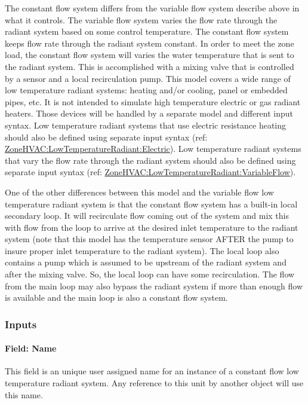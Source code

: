 The constant flow system differs from the variable flow system describe above in what it controls. The variable flow system varies the flow rate through the radiant system based on some control temperature. The constant flow system keeps flow rate through the radiant system constant.  In order to meet the zone load, the constant flow system will varies the water temperature that is sent to the radiant system. This is accomplished with a mixing valve that is controlled by a sensor and a local recirculation pump. This model covers a wide range of low temperature radiant systems: heating and/or cooling, panel or embedded pipes, etc. It is not intended to simulate high temperature electric or gas radiant heaters. Those devices will be handled by a separate model and different input syntax. Low temperature radiant systems that use electric resistance heating should also be defined using separate input syntax (ref: \hyperref[zonehvaclowtemperatureradiantelectric]{ZoneHVAC:LowTemperatureRadiant:Electric}). Low temperature radiant systems that vary the flow rate through the radiant system should also be defined using separate input syntax (ref: \hyperref[zonehvaclowtemperatureradiantvariableflow]{ZoneHVAC:LowTemperatureRadiant:VariableFlow}).

One of the other differences between this model and the variable flow low temperature radiant system is that the constant flow system has a built-in local secondary loop. It will recirculate flow coming out of the system and mix this with flow from the loop to arrive at the desired inlet temperature to the radiant system (note that this model has the temperature sensor AFTER the pump to insure proper inlet temperature to the radiant system). The local loop also contains a pump which is assumed to be upstream of the radiant system and after the mixing valve. So, the local loop can have some recirculation. The flow from the main loop may also bypass the radiant system if more than enough flow is available and the main loop is also a constant flow system.

\subsubsection{Inputs}\label{inputs-6-019}

\paragraph{Field: Name}\label{field-name-6-016}

This field is an unique user assigned name for an instance of a constant flow low temperature radiant system. Any reference to this unit by another object will use this name.

